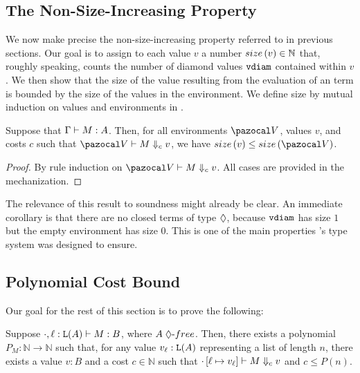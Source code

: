 \subsection{The Non-Size-Increasing Property}
\label{sec:soundness-size}
\enlargethispage{1.7\baselineskip}

We now make precise the non-size-increasing property referred to in previous sections. Our goal is to assign to each value $v$ a number $\valsize{v} \in \mathbb N$ that, roughly speaking, counts the number of diamond values $\mathtt{vdiam}$ contained within $v$.
%
We then show that the size of the value resulting from the evaluation of an \lfplplus term is bounded by the size of the values in the environment. We define size by mutual induction on values and environments in .

\pagebreak


\begin{theorem}
\label{thm:non-size-increasing}
Suppose that $\Gamma \vdash M : A$. Then, for all environments $\env$, values $v$, and costs $c$ such that $\evals{\env}{M}{c}{v}$, we have $\valsize{v} \le \envsize{\env}$.
\end{theorem}
\begin{proof}
By rule induction on $\evals{\env}{M}{c}{v}$. All cases are provided in the mechanization.
\end{proof}

The relevance of this result to soundness might already be clear. An immediate corollary is that there are no closed terms of type $\tpdiam$, because $\mathtt{vdiam}$ has size $1$ but the empty environment has size $0$. This is one of the main properties \lfpl's type system was designed to ensure.



\subsection{Polynomial Cost Bound}

Our goal for the rest of this section is to prove the following:

\begin{theorem}
\label{thm:soundness-concrete}
Suppose $\types{\ctxcons{\ctxnil}{\ell}{\tplist{A}}}{M}{B}$, where $\dfree{A}$. Then, there exists a polynomial $P_M : \mathbb N \to \mathbb N$ such that, for any value $v_\ell : \tplist{A}$ representing a list of length $n$, there exists a value $v : B$ and a cost $c \in \mathbb N$ such that $\cdot \left[ \ell \mapsto v_\ell \right] \vdash M \Downarrow_{c} v$ and $c \le P(n)$.
\end{theorem}

